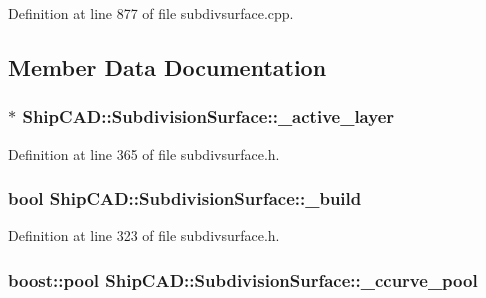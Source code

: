 Definition at line 877 of file subdivsurface.\-cpp.



\subsection{Member Data Documentation}
\hypertarget{classShipCAD_1_1SubdivisionSurface_aef766e0b62189247c0f3214c56800040}{
\subsubsection[{\-\_\-active\-\_\-layer}]{$\ast$ Ship\-C\-A\-D\-::\-Subdivision\-Surface\-::\-\_\-active\-\_\-layer\hspace{0.3cm}{\ttfamily [protected]}}}\label{classShipCAD_1_1SubdivisionSurface_aef766e0b62189247c0f3214c56800040}


Definition at line 365 of file subdivsurface.\-h.

\hypertarget{classShipCAD_1_1SubdivisionSurface_ad360f009ac9c27aad0a88b2df7070414}{
\subsubsection[{\-\_\-build}]{\setlength{\rightskip}{0pt plus 5cm}bool Ship\-C\-A\-D\-::\-Subdivision\-Surface\-::\-\_\-build\hspace{0.3cm}{\ttfamily [protected]}}}\label{classShipCAD_1_1SubdivisionSurface_ad360f009ac9c27aad0a88b2df7070414}


Definition at line 323 of file subdivsurface.\-h.

\hypertarget{classShipCAD_1_1SubdivisionSurface_ae20f94c83bac02bae90a905379765b0a}{
\subsubsection[{\-\_\-ccurve\-\_\-pool}]{\setlength{\rightskip}{0pt plus 5cm}boost\-::pool Ship\-C\-A\-D\-::\-Subdivision\-Surface\-::\-\_\-ccurve\-\_\-pool\hspace{0.3cm}{\ttfamily [protected]}}}\label{classShipCAD_1_1SubdivisionSurface_ae20f94c83bac02bae90a905379765b0a}


